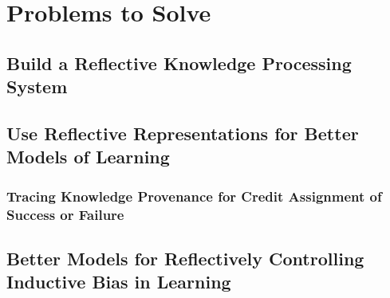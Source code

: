 \chapter{Problems to Solve}\label{ch:problems_to_solve}

\section{Build a Reflective Knowledge Processing System}



\section{Use Reflective Representations for Better Models of Learning}

\subsection{Tracing Knowledge Provenance for Credit Assignment of Success or Failure}

\section{Better Models for Reflectively Controlling Inductive Bias in Learning}

